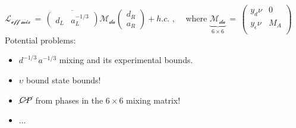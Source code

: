 \documentclass[10pt,letterpaper,oneside]{article}
\begin{document}
$\mathcal{L_{\text{eff mix}}}\,=\,
\overline{\left(\begin{matrix}
d_L & a_L^{-1/3}
\end{matrix}\right)} \mathcal{M_{\text{da}}} 
\left(\begin{matrix}
d_R \\
a_R
\end{matrix}\right) +h.c.$ , $\quad$where $\underbrace{\mathcal{M_{\text{da}}}}_{6\times 6}\, = \, 
\left(\begin{matrix}
y_d \nu & 0 \\
y_{\epsilon} \nu & M_A \\
\end{matrix}\right)$
\\
Potential problems: \begin{itemize}
\item $d^{-1/3}\, a^{-1/3}$ mixing and its experimental bounds. \\
\item $\upsilon$ bound state bounds! \\
\item $\cancel{CP}$ from phases in the $6\times 6$ mixing matrix! \\
\item $\dots$
\end{itemize}
\end{document}
